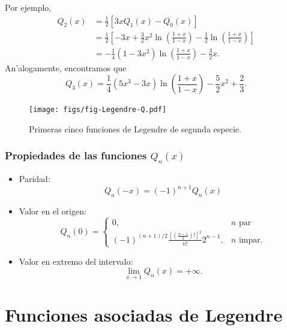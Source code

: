 Por ejemplo,
\begin{align}
Q_2(x) &= \frac{1}{2}\left[3xQ_1(x)-Q_0(x)\right] \\
&= \frac{1}{2}\left[-3x+\frac{3}{2}x^2\ln\left(\frac{1+x}{1-x}\right)-\frac{1}{2}\ln\left(\frac{1+x}{1-x}\right)\right] \\
&= -\frac{1}{4}(1-3x^2)\ln\left(\frac{1+x}{1-x}\right) -\frac{3}{2}x.
\end{align}
An'alogamente, encontramos que
\begin{equation}
Q_3(x)=\frac{1}{4}(5x^3-3x)\ln\left(\frac{1+x}{1-x}\right)-\frac{5}{2}x^2+\frac{2}{3}.
\end{equation}
\begin{figure}[H]
\centering
\texttt{[image: figs/fig-Legendre-Q.pdf]}
\caption{Primeras cinco funciones de Legendre de segunda especie.}
\label{fig-Qn}
\end{figure}

\subsubsection{Propiedades de las funciones $Q_n(x)$}
\begin{itemize}
\item Paridad:
\begin{equation}
Q_n(-x)=(-1)^{n+1}Q_n(x)
\end{equation}

\item Valor en el origen:
\begin{equation}
Q_n(0)=
\begin{cases}
0, &  n\text{ par} \\
(-1)^{(n+1)/2}\frac{\left[\left(\frac{n-1}{2}\right)!\right]^2}{n!}2^{n-1}, & n\text{ impar}.
\end{cases}
\end{equation}

\item Valor en extremo del intervalo:
\begin{equation}
\lim_{x\to 1}Q_n(x)=+\infty .
\end{equation}
\end{itemize}



\section{Funciones asociadas de Legendre}

